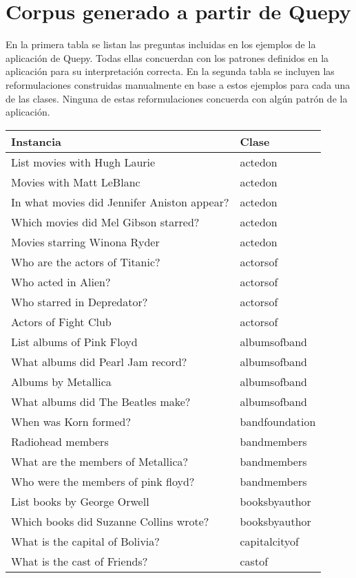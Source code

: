 \chapter{Corpus generado a partir de Quepy}\label{ap-3}

En la primera tabla se listan las preguntas incluidas en los ejemplos de la aplicación de Quepy. Todas ellas concuerdan con los patrones definidos en la aplicación para su interpretación correcta. En la segunda tabla se incluyen las reformulaciones construidas manualmente en base a estos ejemplos para cada una de las clases. Ninguna de estas reformulaciones concuerda con algún patrón de la aplicación.

\begin{longtable}{l l}
Instancia & Clase \\
\hline
List movies with Hugh Laurie & actedon\\
Movies with Matt LeBlanc & actedon\\
In what movies did Jennifer Aniston appear? & actedon\\
Which movies did Mel Gibson starred? & actedon\\
Movies starring Winona Ryder & actedon\\
Who are the actors of Titanic? & actorsof\\
Who acted in Alien? & actorsof\\
Who starred in Depredator? & actorsof\\
Actors of Fight Club & actorsof\\
List albums of Pink Floyd & albumsofband\\
What albums did Pearl Jam record? & albumsofband\\
Albums by Metallica & albumsofband\\
What albums did The Beatles make? & albumsofband\\
When was Korn formed? & bandfoundation\\
Radiohead members & bandmembers\\
What are the members of Metallica? & bandmembers\\
Who were the members of pink floyd? & bandmembers\\
List books by George Orwell & booksbyauthor\\
Which books did Suzanne Collins wrote? & booksbyauthor\\
What is the capital of Bolivia? & capitalcityof\\
What is the cast of Friends? & castof\\

\end{longtable}
